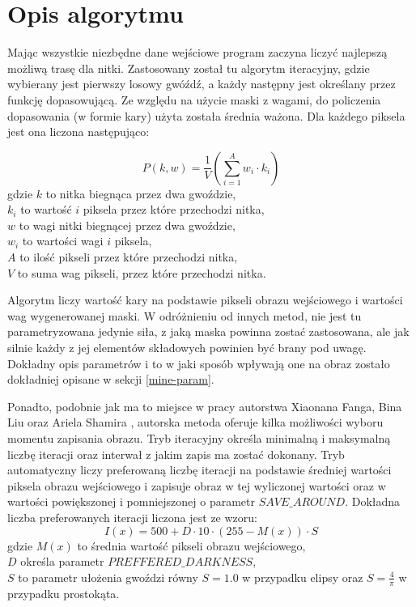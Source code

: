     \section{Opis algorytmu} \label{mine-algorithm}
    Mając wszystkie niezbędne dane wejściowe program zaczyna liczyć najlepszą możliwą trasę dla nitki. Zastosowany został tu algorytm iteracyjny, gdzie wybierany jest pierwszy losowy gwóźdź, a każdy następny jest określany przez funkcję dopasowującą. Ze względu na użycie maski z wagami, do policzenia dopasowania (w formie kary) użyta została średnia ważona. Dla każdego piksela jest ona liczona następująco: 
    
    \begin{equation} \label{mine-algorithm-penalty}
        P(k, w) = \frac{1}{V} (\sum_{i=1}^A w_i \cdot k_i)
    \end{equation}
    gdzie \(k\) to nitka biegnąca przez dwa gwoździe,\\
    \(k_i\) to wartość \(i\) piksela przez które przechodzi nitka,\\
    \(w\) to wagi nitki biegnącej przez dwa gwoździe,\\
    \(w_i\) to wartości wagi \(i\) piksela,\\
    \(A\) to ilość pikseli przez które przechodzi nitka,\\
    \(V\) to suma wag pikseli, przez które przechodzi nitka.
    
    Algorytm liczy wartość kary na podstawie pikseli obrazu wejściowego i wartości wag wygenerowanej maski. W odróżnieniu od innych metod, nie jest tu parametryzowana jedynie siła, z jaką maska powinna zostać zastosowana, ale jak silnie każdy z jej elementów składowych powinien być brany pod uwagę. Dokładny opis parametrów i to w jaki sposób wpływają one na obraz zostało dokładniej opisane w sekcji \ref{mine-param}.
    
    Ponadto, podobnie jak ma to miejsce w pracy autorstwa Xiaonana Fanga, Bina Liu oraz Ariela Shamira \cite{article-string-art-xiaonan}, autorska metoda oferuje kilka możliwości wyboru momentu zapisania obrazu. Tryb iteracyjny określa minimalną i maksymalną liczbę iteracji oraz interwał z jakim zapis ma zostać dokonany. Tryb automatyczny liczy preferowaną liczbę iteracji na podstawie średniej wartości piksela obrazu wejściowego i zapisuje obraz w tej wyliczonej wartości oraz w wartości powiększonej i pomniejszonej o parametr \(SAVE\_AROUND\). Dokładna liczba preferowanych iteracji liczona jest ze wzoru:
    \begin{equation} \label{mine-algorithm-iterations}
        I(x) = 500 + D \cdot 10 \cdot (255 - M(x)) \cdot S
    \end{equation}
    gdzie \(M(x)\) to średnia wartość pikseli obrazu wejściowego,\\
    \(D\) określa parametr \(PREFFERED\_DARKNESS\),\\
    \(S\) to parametr ułożenia gwoździ równy \(S = 1.0\) w przypadku elipsy oraz \(S = \frac{4}{\pi}\) w przypadku prostokąta.
    
